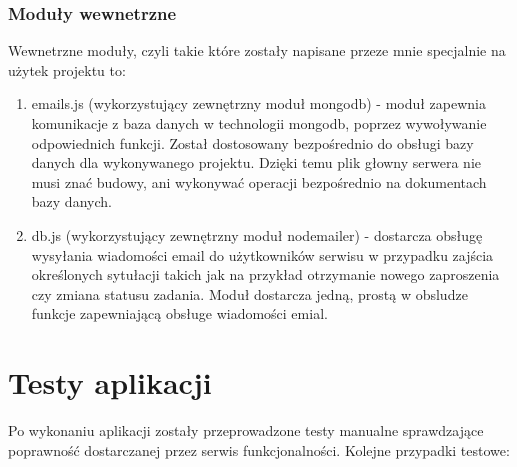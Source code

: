 \documentclass[12pt]{report}
\begin{document}
\subsection{Moduły wewnetrzne}
Wewnetrzne moduły, czyli takie które zostały napisane przeze mnie specjalnie na użytek projektu to:
\begin{enumerate}
\item emails.js (wykorzystujący zewnętrzny moduł mongodb) - moduł zapewnia komunikacje z baza danych w technologii mongodb, poprzez wywoływanie odpowiednich funkcji. 
Został dostosowany bezpośrednio do obsługi bazy danych dla wykonywanego projektu. 
Dzięki temu plik głowny serwera nie musi znać budowy, ani wykonywać operacji bezpośrednio na dokumentach bazy danych.
\item db.js (wykorzystujący zewnętrzny moduł nodemailer) - dostarcza obsługę wysyłania wiadomości email do użytkowników serwisu w przypadku zajścia określonych sytułacji takich jak na przykład otrzymanie nowego zaproszenia czy zmiana statusu zadania. Moduł dostarcza jedną, prostą w obsludze funkcje zapewniającą obsługe wiadomości emial. 
\end{enumerate}
 
\chapter{Testy aplikacji}

Po wykonaniu aplikacji zostały przeprowadzone testy manualne sprawdzające poprawność dostarczanej przez serwis funkcjonalności.
Kolejne przypadki testowe:
\end{document}
